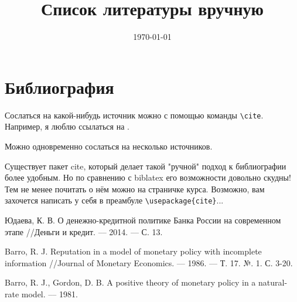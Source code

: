 \documentclass[pdftex, 12pt, a4paper]{article}
\title{Список литературы вручную}
\date{\today}
\theoremstyle{plain}              %
\theoremstyle{definition}         %
\begin{document}

\tableofcontents

\section{Библиография}

Сослаться на какой-нибудь источник можно с помощью команды \verb|\cite|. Например, я люблю ссылаться на \cite{UDAEVA}.

Можно одновременно сослаться на несколько источников\cite{UDAEVA,barro1986reputation,3}.

Существует пакет cite, который делает такой "ручной" подход к библиографии более удобным. Но по сравнению с biblatex его возможности довольно скудны! Тем не менее почитать о нём можно на страничке курса. Возможно, вам захочется написать у себя в преамбуле \verb|\usepackage{cite}|...


\newpage

\renewcommand{\refname}{Чтиво}  %


\begin{thebibliography}{99}

 Юдаева, К. В. О денежно-кредитной политике Банка России на современном этапе //Деньги и кредит. –-- 2014. –-- С. 13.

 Barro, R. J. Reputation in a model of monetary policy with incomplete information //Journal of Monetary Economics. –-- 1986. –-- Т. 17. №. 1. С. 3-20.

 Barro, R. J., Gordon, D. B. A positive theory of monetary policy in a natural-rate model. –-- 1981.
\end{thebibliography}
\end{document}
